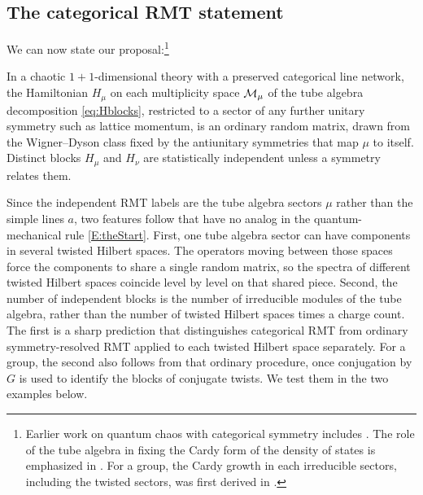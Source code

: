 \documentclass[11pt]{article}
\numberwithin{equation}{section}
\begin{document}
\subsection{The categorical RMT statement}
\label{sec:statement}

We can now state our proposal:\footnote{Earlier work on quantum chaos
with categorical symmetry includes \cite{ODea:2024tkt}. The role of the tube
algebra in fixing the Cardy form of the density of states is emphasized in \cite{Lin:2022dhv}. For a group, the Cardy growth in each irreducible sectors, including the twisted sectors, was first derived in \cite{Pal:2020wwd}.}

\begin{tcolorbox}[
  colback=gray!10,
  colframe=blue,
  boxrule=0.6pt,
  arc=2pt,
  left=6pt,
  right=6pt,
  top=4pt,
  bottom=4pt]
  In a chaotic $1+1$-dimensional theory with a preserved categorical line network, the Hamiltonian
  $H_\mu$ on each multiplicity space $\mathcal{M}_\mu$ of the tube algebra decomposition \eqref{eq:Hblocks},
  restricted to a sector of any further unitary symmetry such as lattice momentum,
  is an ordinary random matrix, drawn from the Wigner--Dyson class fixed by the antiunitary
  symmetries that map $\mu$ to itself. Distinct blocks $H_\mu$ and $H_\nu$ are statistically
  independent unless a symmetry relates them.
\end{tcolorbox}


Since the independent RMT labels are the tube algebra sectors $\mu$ rather than the simple lines $a$,
two features follow that have no analog in the quantum-mechanical rule \eqref{E:theStart}. First, one tube algebra sector can
have components in several twisted Hilbert spaces. The operators moving between those spaces force
the components to share a single random matrix, so the spectra of different twisted Hilbert spaces
coincide level by level on that shared piece. Second, the number of independent blocks is the
number of irreducible modules of the tube algebra, rather than the number of twisted Hilbert spaces
times a charge count. The first is a sharp prediction that distinguishes categorical RMT from ordinary
symmetry-resolved RMT applied to each twisted Hilbert space separately. For a group, the second also follows from that ordinary procedure, once conjugation by $G$ is used to identify the blocks of conjugate twists. We test them in the two
examples below.
\end{document}
